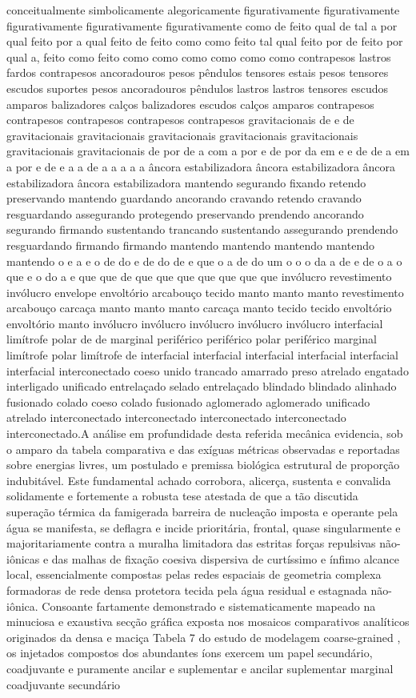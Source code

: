 conceitualmente simbolicamente alegoricamente figurativamente figurativamente figurativamente figurativamente figurativamente como de feito qual de tal a por qual feito por a qual feito de feito como como feito tal qual feito por de feito por qual a, feito como feito como como como como como como contrapesos lastros fardos contrapesos ancoradouros pesos pêndulos tensores estais pesos tensores escudos suportes pesos ancoradouros pêndulos lastros lastros tensores escudos amparos balizadores calços balizadores escudos calços amparos contrapesos contrapesos contrapesos contrapesos contrapesos gravitacionais de e de gravitacionais gravitacionais gravitacionais gravitacionais gravitacionais gravitacionais gravitacionais de por de a com a por e de por da em e e de de a em a por e de e a a de a a a a a âncora estabilizadora âncora estabilizadora âncora estabilizadora âncora estabilizadora mantendo segurando fixando retendo preservando mantendo guardando ancorando cravando retendo cravando resguardando assegurando protegendo preservando prendendo ancorando segurando firmando sustentando trancando sustentando assegurando prendendo resguardando firmando firmando mantendo mantendo mantendo mantendo mantendo o e a e o de do e de do de e que o a de do um o o o da a de e de o a o que e o do a e que que de que que que que que que que invólucro revestimento invólucro envelope envoltório arcabouço tecido manto manto manto revestimento arcabouço carcaça manto manto manto carcaça manto tecido tecido envoltório envoltório manto invólucro invólucro invólucro invólucro invólucro interfacial limítrofe polar de de marginal periférico periférico polar periférico marginal limítrofe polar limítrofe de interfacial interfacial interfacial interfacial interfacial interfacial interconectado coeso unido trancado amarrado preso atrelado engatado interligado unificado entrelaçado selado entrelaçado blindado blindado alinhado fusionado colado coeso colado fusionado aglomerado aglomerado unificado atrelado interconectado interconectado interconectado interconectado interconectado.A análise em profundidade desta referida mecânica evidencia, sob o amparo da tabela comparativa e das exíguas métricas observadas e reportadas sobre energias livres, um postulado e premissa biológica estrutural de proporção indubitável. Este fundamental achado corrobora, alicerça, sustenta e convalida solidamente e fortemente a robusta tese atestada de que a tão discutida superação térmica da famigerada barreira de nucleação imposta e operante pela água se manifesta, se deflagra e incide prioritária, frontal, quase singularmente e majoritariamente contra a muralha limitadora das estritas forças repulsivas não-iônicas e das malhas de fixação coesiva dispersiva de curtíssimo e ínfimo alcance local, essencialmente compostas pelas redes espaciais de geometria complexa formadoras de rede densa protetora tecida pela água residual e estagnada não-iônica. Consoante fartamente demonstrado e sistematicamente mapeado na minuciosa e exaustiva secção gráfica exposta nos mosaicos comparativos analíticos originados da densa e maciça Tabela 7 do estudo de modelagem coarse-grained , os injetados compostos dos abundantes íons exercem um papel secundário, coadjuvante e puramente ancilar e suplementar e ancilar suplementar marginal coadjuvante secundário 